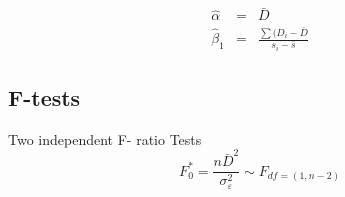 \documentclass[12pt]{article}
\begin{document}
\begin{eqnarray}
\hat{\alpha} &=& \bar{D} \\
\hat{\beta}_1 &=& \frac{\sum(D_i - \bar{D}}{s_i - \bar{s}}
\end{eqnarray}

\subsection{F-tests}

Two independent F- ratio Tests
\[ F^{\ast}_0 = \frac{n\bar{D}^2}{\sigma^2_\varepsilon} \sim F_{df = (1,n-2)}\]

\end{document}
